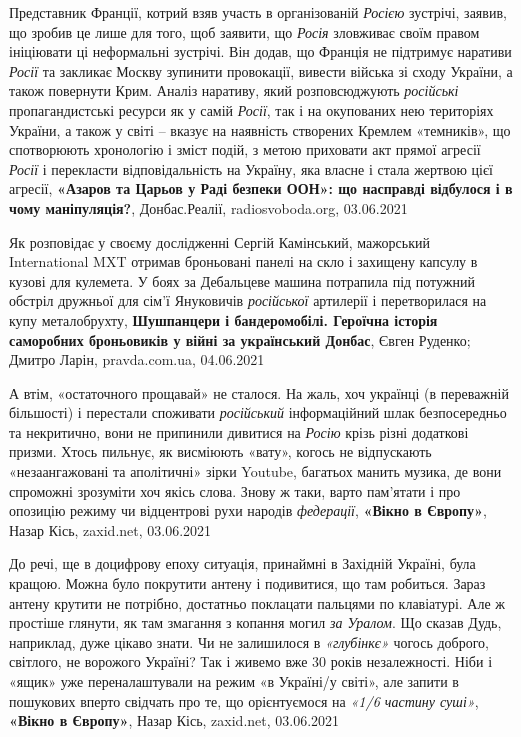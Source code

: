 Представник Франції, котрий взяв участь в організованій \emph{Росією} зустрічі,
заявив, що зробив це лише для того, щоб заявити, що \emph{Росія} зловживає
своїм правом ініціювати ці неформальні зустрічі. Він додав, що Франція не
підтримує наративи \emph{Росії} та закликає Москву зупинити провокації, вивести
війська зі сходу України, а також повернути Крим.  Аналіз наративу, який
розповсюджують \emph{російські} пропагандистські ресурси як у самій \emph{Росії}, так
і на окупованих нею територіях України, а також у світі – вказує на наявність
створених Кремлем «темників», що спотворюють хронологію і зміст подій, з метою
приховати акт прямої агресії \emph{Росії} і перекласти відповідальність на
Україну, яка власне і стала жертвою цієї агресії,
\textbf{«Азаров та Царьов у Раді безпеки ООН»: що насправді відбулося і в чому маніпуляція?},
Донбас.Реалії, radiosvoboda.org, 03.06.2021

Як розповідає у своєму дослідженні Сергій Камінський, мажорський International
MXT отримав броньовані панелі на скло і захищену капсулу в кузові для кулемета.
У боях за Дебальцеве машина потрапила під потужний обстріл дружньої для сім'ї
Януковичів \emph{російської} артилерії і перетворилася на купу металобрухту,
\textbf{Шушпанцери і бандеромобілі. Героїчна історія саморобних броньовиків у війні за український Донбас},
Євген Руденко; Дмитро Ларін, pravda.com.ua, 04.06.2021

А втім, «остаточного прощавай» не сталося. На жаль, хоч українці (в переважній
більшості) і перестали споживати \emph{російський} інформаційний шлак безпосередньо та
некритично, вони не припинили дивитися на \emph{Росію} крізь різні додаткові призми.
Хтось пильнує, як висміюють «вату», когось не відпускають «незаангажовані та
аполітичні» зірки Youtube, багатьох манить музика, де вони спроможні зрозуміти
хоч якісь слова. Знову ж таки, варто пам'ятати і про опозицію режиму чи
відцентрові рухи народів \emph{федерації},
\textbf{«Вікно в Європу»}, Назар Кісь, zaxid.net, 03.06.2021

До речі, ще в доцифрову епоху ситуація, принаймні в Західній Україні, була
кращою. Можна було покрутити антену і подивитися, що там робиться. Зараз антену
крутити не потрібно, достатньо поклацати пальцями по клавіатурі. Але ж простіше
глянути, як там змагання з копання могил \emph{за Уралом}. Що сказав Дудь, наприклад,
дуже цікаво знати. Чи не залишилося в \emph{«глубінкє»} чогось доброго, світлого, не
ворожого Україні?  Так і живемо вже 30 років незалежності. Ніби і «ящик» уже
переналаштували на режим «в Україні/у світі», але запити в пошукових вперто
свідчать про те, що орієнтуємося на \emph{«1/6 частину суші»},
\textbf{«Вікно в Європу»}, Назар Кісь, zaxid.net, 03.06.2021

